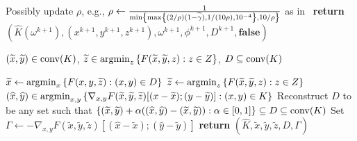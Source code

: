 \begin{algorithm}[H]
\begin{algorithmic}[1]
        \EndIf
        \State Possibly update $\rho$, e.g., $\rho \gets \frac{1}{\min \left\{ \max \left\{ (2/\rho)(1-\widetilde{\gamma}),1/(10\rho),10^{-4} \right \}, 10/\rho \right \}}$ as in~\cite{Kiwiel1995} \label{Alg4RhoUpdate}
        \EndFor  
      \State \textbf{return}  $(\widehat{K}(\omega^{k+1}),(x^{k+1},y^{k+1},z^{k+1}),\omega^{k+1},{\phi}^{k+1}, D^{k+1}, \textbf{false})$
\EndFunction
\end{algorithmic}
\medskip
\begin{algorithmic}
 $(\widetilde{x},\widetilde{y}) \in \operatorname{conv}(K)$, $\widetilde{z} \in \operatorname*{argmin}_z \left\{ F(\widetilde{x},\widetilde{y},z) : z \in Z \right \}$, $D \subseteq \operatorname{conv}(K)$
\end{algorithmic}
\begin{algorithmic}[1]
         \label{ForXYUpdateBegin}
           \State $\widetilde{x} \gets \operatorname*{argmin}_x \left\{ F(x, y,\widetilde{z}) : (x,y) \in D \right \}$ \label{SDMGSXUpdate}
	\State $\widetilde{z} \gets \operatorname*{argmin}_z \left\{ F(\widetilde{x},\widetilde{y},z) : z \in Z \right \}$ \label{SDMGSZUpdate}
        \EndFor \label{ForXYUpdateEnd}
	\State $(\widehat{x},\widehat{y}) \in \operatorname*{argmin}_{x,y} \left\{ \nabla_{x,y} F(\widetilde{x},\widetilde{y},\widetilde{z}) [(x - \widetilde{x});(y-\widetilde{y})] : (x,y) \in K \right \}$ \label{SCGDirFindingSP}
	 \State Reconstruct ${D}$ to be any set such that \label{LineDa}
	 \State \quad $\left\{ (\widetilde{x},\widetilde{y}) + \alpha ((\widehat{x},\widehat{y}) - (\widetilde{x},\widetilde{y})) : \alpha \in [0,1] \right \} \subseteq {D} \subseteq \operatorname{conv}(K)$ \label{LineDb}
	 \State Set $\Gamma \gets - \nabla_{x,y} F(\widetilde{x},\widetilde{y},\widetilde{z}) [(\widehat{x} - \widetilde{x});(\widehat{y} -\widetilde{y})]$ \label{GammaLine}
      \State \textbf{return} $\left(\widehat{K},\widetilde{x},\widetilde{y},\widetilde{z},{D}, \Gamma \right)$ 
\EndFunction
\end{algorithmic}
\end{algorithm} 







